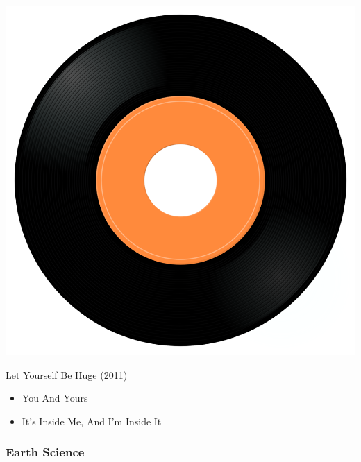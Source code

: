 \begin{minipage}[t]{0.25\textwidth}
\captionsetup{type=figure}
\includegraphics[width=\textwidth]{Images/cover.png}
\caption*{Let Yourself Be Huge (2011)}
\end{minipage}
\begin{minipage}[t]{0.25\textwidth}\vspace{0pt}
\begin{itemize}[nosep,leftmargin=1em,labelwidth=*,align=left]
	\setlength{\itemsep}{0pt}
	\item You And Yours
	\item It's Inside Me, And I'm Inside It
\end{itemize}
\end{minipage}

\subsubsection{Earth Science}

